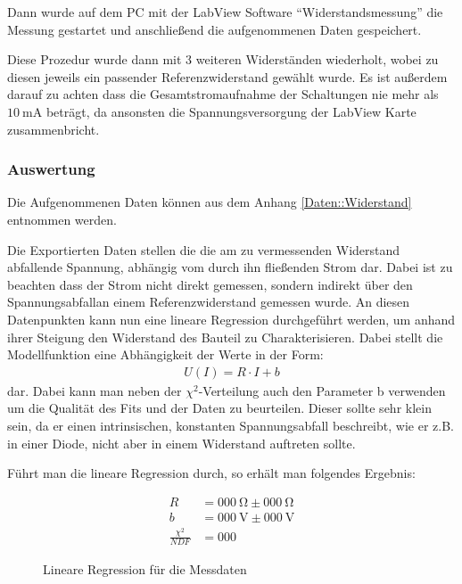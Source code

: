 \documentclass[12pt,twoside,a4paper]{scrartcl}
\begin{document}
				Dann wurde auf dem PC mit der LabView Software ``Widerstandsmessung'' die Messung gestartet und anschließend die aufgenommenen Daten gespeichert.

				Diese Prozedur wurde dann mit 3 weiteren Widerständen wiederholt, wobei zu diesen jeweils ein passender Referenzwiderstand gewählt wurde.
				Es ist außerdem darauf zu achten dass die Gesamtstromaufnahme der Schaltungen nie mehr als $\SI{10}{\milli \ampere}$ beträgt, da ansonsten die Spannungsversorgung der LabView Karte zusammenbricht.

			\subsubsection{Auswertung}

				Die Aufgenommenen Daten können aus dem Anhang \ref{Daten::Widerstand} entnommen werden.

				Die Exportierten Daten stellen die die am zu vermessenden Widerstand abfallende Spannung, abhängig vom durch ihn fließenden Strom dar. Dabei ist zu beachten dass der Strom nicht direkt gemessen, sondern indirekt über den Spannungsabfallan einem Referenzwiderstand gemessen wurde. An diesen Datenpunkten kann nun eine lineare Regression durchgeführt werden, um anhand ihrer Steigung den Widerstand des Bauteil zu Charakterisieren. Dabei stellt die Modellfunktion eine Abhängigkeit der Werte in der Form:
				\begin{align*}
					U(I) = R \cdot I + b
				\end{align*}
				dar. Dabei kann man neben der $\chi^2$-Verteilung auch den Parameter b verwenden um die Qualität des Fits und der Daten zu beurteilen. Dieser sollte sehr klein sein, da er einen intrinsischen, konstanten Spannungsabfall beschreibt, wie er z.B. in einer Diode, nicht aber in einem Widerstand auftreten sollte.

				Führt man die lineare Regression durch, so erhält man folgendes Ergebnis:

				\begin{figure}[H]
					\centering
					\begin{minipage}{0.69 \textwidth}
						\caption{Lineare Regression für die Messdaten}
					\end{minipage}
					\begin{minipage}{0.29 \textwidth}
						\begin{align*}
							R &= \SI{000}{\ohm} \pm \SI{000}{\ohm}\\
							b &= \SI{000}{\volt} \pm \SI{000}{\volt}\\
							\frac{\chi^2}{NDF} &= 000
						\end{align*}
					\end{minipage}
			\end{figure}
\end{document}
